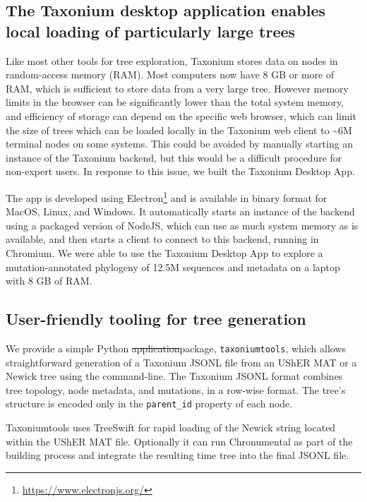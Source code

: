 \documentclass[twocolumn]{bioRxiv}
\providecommand{\DIFadd}[1]{{\protect\color{teal}#1}}
\providecommand{\DIFdel}[1]{{\protect\color{red}\sout{#1}}}
\providecommand{\DIFaddbegin}{}
\providecommand{\DIFaddend}{}
\providecommand{\DIFdelbegin}{}
\providecommand{\DIFdelend}{}
\begin{document}
\DIFaddbegin \subsection*{\DIFadd{The Taxonium desktop application enables local loading of particularly large trees}}

\DIFadd{Like most other tools for tree exploration, Taxonium stores data on nodes in random-access memory (RAM). Most computers now have 8 GB or more of RAM, which is sufficient to store data from a very large tree. However memory limits in the browser can be significantly lower than the total system memory, and efficiency of storage can depend on the specific web browser, which can limit the size of trees which can be loaded locally in the Taxonium web client to \textasciitilde{}6M terminal nodes on some systems. This could be avoided by manually starting an instance of the Taxonium backend, but this would be a difficult procedure for non-expert users. In response to this issue, we built the Taxonium Desktop App.
}

\DIFadd{The app is developed using Electron}\footnote{\url{https://www.electronjs.org/}} \DIFadd{and is available in binary format for MacOS, Linux, and Windows. It automatically starts an instance of the backend using a packaged version of NodeJS, 
which can use as much system memory as is available, and then starts a client to connect to this backend, running in Chromium. We were able to use the Taxonium Desktop App to explore a mutation-annotated phylogeny of 12.5M sequences and metadata on a laptop with 8 GB of RAM.
}



\DIFaddend \subsection*{User-friendly tooling for tree generation}

We provide a simple Python \DIFdelbegin \DIFdel{application}\DIFdelend \DIFaddbegin \DIFadd{package}\DIFaddend , \texttt{taxoniumtools}, which allows straightforward generation of a Taxonium JSONL file from an UShER MAT \DIFaddbegin \DIFadd{or a Newick tree using the command-line}\DIFaddend . The Taxonium JSONL format combines tree topology, node metadata, and mutations, in a row-wise format. The tree's structure is encoded only in the \texttt{parent\_id} property of each node.

Taxoniumtools uses TreeSwift \citep{moshiri2020treeswift} for rapid loading of the Newick string located within the UShER MAT file. Optionally it can run Chronumental \citep{chronumental} as part of the building process and integrate the resulting time tree into the final JSONL file.
\end{document}
